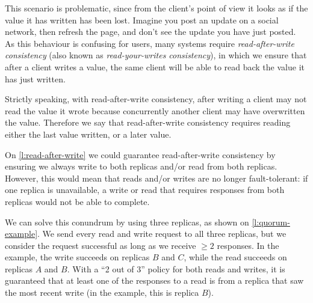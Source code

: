 This scenario is problematic, since from the client's point of view it looks as if the value it has written has been lost.
Imagine you post an update on a social network, then refresh the page, and don't see the update you have just posted.
As this behaviour is confusing for users, many systems require \emph{read-after-write consistency} (also known as \emph{read-your-writes consistency}), in which we ensure that after a client writes a value, the same client will be able to read back the value it has just written.

Strictly speaking, with read-after-write consistency, after writing a client may not read the value it wrote because concurrently another client may have overwritten the value.
Therefore we say that read-after-write consistency requires reading either the last value written, or a later value.

On \autoref{l:read-after-write} we could guarantee read-after-write consistency by ensuring we always write to both replicas and/or read from both replicas.
However, this would mean that reads and/or writes are no longer fault-tolerant: if one replica is unavailable, a write or read that requires responses from both replicas would not be able to complete.

We can solve this conundrum by using three replicas, as shown on \autoref{l:quorum-example}.
We send every read and write request to all three replicas, but we consider the request successful as long as we receive $\ge 2$ responses.
In the example, the write succeeds on replicas $B$ and $C$, while the read succeeds on replicas $A$ and $B$.
With a ``2 out of 3'' policy for both reads and writes, it is guaranteed that at least one of the responses to a read is from a replica that saw the most recent write (in the example, this is replica $B$).


